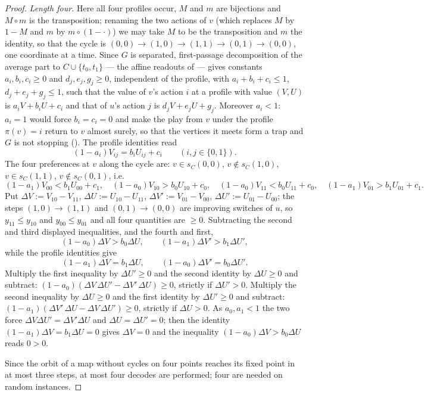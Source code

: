 \begin{proof}
\emph{Length four.} Here all four profiles occur, $M$ and $m$ are
bijections and $M\circ m$ is the transposition; renaming the two actions of
$v$ (which replaces $M$ by $1-M$ and $m$ by $m\circ(1-\cdot)$) we may take
$M$ to be the transposition and $m$ the identity, so that the cycle is
$(0,0)\to(1,0)\to(1,1)\to(0,1)\to(0,0)$, one coordinate at a time. Since
$G$ is separated, first-passage decomposition of the average part to
$C\cup\{t_0,t_1\}$ --- the affine readouts of
 --- gives constants
$a_i,b_i,c_i\ge0$ and $d_j,e_j,g_j\ge0$, independent of the profile, with
$a_i+b_i+c_i\le1$, $d_j+e_j+g_j\le1$, such that the value of $v$'s action
$i$ at a profile with value $(V,U)$ is $a_iV+b_iU+c_i$ and that of $u$'s
action $j$ is $d_jV+e_jU+g_j$. Moreover $a_i<1$: $a_i=1$ would force
$b_i=c_i=0$ and make the play from $v$ under the profile $\pi(v)=i$ return
to $v$ almost surely, so that the vertices it meets form a trap and $G$ is
not stopping (). The profile identities read
\[
  (1-a_i)V_{ij}=b_iU_{ij}+c_i \qquad (i,j\in\{0,1\}).
\]
The four preferences at $v$ along the cycle are: $v\in s_C(0,0)$,
$v\notin s_C(1,0)$, $v\in s_C(1,1)$, $v\notin s_C(0,1)$, i.e.
\[
  (1-a_1)V_{00}<b_1U_{00}+c_1,\quad (1-a_0)V_{10}>b_0U_{10}+c_0,\quad
  (1-a_0)V_{11}<b_0U_{11}+c_0,\quad (1-a_1)V_{01}>b_1U_{01}+c_1 .
\]
Put $\Delta V:=V_{10}-V_{11}$, $\Delta U:=U_{10}-U_{11}$,
$\Delta V':=V_{01}-V_{00}$, $\Delta U':=U_{01}-U_{00}$; the steps
$(1,0)\to(1,1)$ and $(0,1)\to(0,0)$ are improving switches of $u$, so
$y_{11}\le y_{10}$ and $y_{00}\le y_{01}$ and all four quantities are
$\ge0$. Subtracting the second and third displayed inequalities, and the
fourth and first,
\[
  (1-a_0)\Delta V>b_0\Delta U,\qquad (1-a_1)\Delta V'>b_1\Delta U',
\]
while the profile identities give
\[
  (1-a_1)\Delta V=b_1\Delta U,\qquad (1-a_0)\Delta V'=b_0\Delta U'.
\]
Multiply the first inequality by $\Delta U'\ge0$ and the second identity by
$\Delta U\ge0$ and subtract:
$(1-a_0)(\Delta V\,\Delta U'-\Delta V'\,\Delta U)\ge0$, strictly if
$\Delta U'>0$. Multiply the second inequality by $\Delta U\ge0$ and the
first identity by $\Delta U'\ge0$ and subtract:
$(1-a_1)(\Delta V'\,\Delta U-\Delta V\,\Delta U')\ge0$, strictly if
$\Delta U>0$. As $a_0,a_1<1$ the two force
$\Delta V\Delta U'=\Delta V'\Delta U$ and $\Delta U=\Delta U'=0$; then the
identity $(1-a_1)\Delta V=b_1\Delta U=0$ gives $\Delta V=0$ and the
inequality $(1-a_0)\Delta V>b_0\Delta U$ reads $0>0$.

Since the orbit of a map without cycles on four points reaches its fixed
point in at most three steps, at most four decodes are performed; four are
needed on random instances.
\end{proof}

